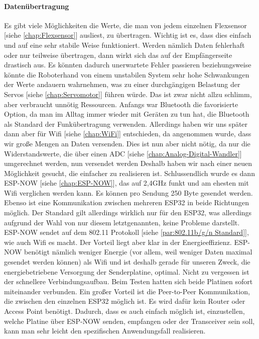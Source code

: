 \documentclass[titlepage,12pt,twoside]{article}
\begin{document}
\paragraph{Datenübertragung}
\label{par:Datenübertragung}
\hfill \break
\hfill \break
Es gibt viele Möglichkeiten die Werte, die man von jedem einzelnen Flexsensor [siehe \textcolor{blue}{\autoref{chap:Flexsensor}}] ausliest, zu übertragen. Wichtig ist es, dass 
dies einfach und auf eine sehr stabile Weise funktioniert. Werden nämlich Daten fehlerhaft oder nur teilweise übertragen, dann 
wirkt sich das auf der Empfängerseite drastisch aus. Es könnten dadurch unerwartete Fehler passieren beziehungsweise könnte die 
Roboterhand von einem unstabilen System sehr hohe Schwankungen der Werte andauern wahrnehmen, was zu einer durchgängigen 
Belastung der Servos [siehe \textcolor{blue}{\autoref{chap:Servomotor}}] führen würde. Das ist zwar nicht allzu schlimm, aber verbraucht unnötig Ressourcen. Anfangs war Bluetooth 
die favorisierte Option, da man im Alltag immer wieder mit Geräten zu tun hat, die Bluetooth als Standard der Funkübertragung 
verwenden. Allerdings haben wir uns später dann aber für Wifi [siehe \textcolor{blue}{\autoref{chap:WiFi}}] entschieden, da angenommen wurde, dass wir große Mengen an Daten 
versenden. Dies ist nun aber nicht nötig, da nur die Widerstandswerte, die über einen ADC [siehe \textcolor{blue}{\autoref{chap:Analog-Digital-Wandler}}] umgerechnet werden, nun versendet 
werden Deshalb haben wir nach einer neuen Möglichkeit gesucht, die einfacher zu realisieren ist. Schlussendlich wurde es dann 
ESP-NOW [siehe \textcolor{blue}{\autoref{chap:ESP-NOW}}], das auf 2,4GHz funkt und am ehesten mit Wifi verglichen werden kann. Es können pro Sendung 250 Byte gesendet werden. 
Ebenso ist eine Kommunikation zwischen mehreren ESP32 in beide Richtungen möglich. Der Standard gilt allerdings wirklich nur 
für den ESP32, was allerdings aufgrund der Wahl von nur diesem letztgenannten, keine Probleme darstellt. ESP-NOW sendet auf dem 
802.11 Protokoll [siehe \textcolor{blue}{\autoref{par:802.11b/g/n Standard}}], wie auch Wifi es macht. Der Vorteil liegt aber klar in der Energieeffizienz. ESP-NOW benötigt nämlich weniger 
Energie (vor allem, weil weniger Daten maximal gesendet werden können) als Wifi und ist deshalb gerade für unseren Zweck, die 
energiebetriebene Versorgung der Senderplatine, optimal. Nicht zu vergessen ist der schnellere Verbindungsaufbau. Beim Testen 
hatten sich beide Platinen sofort miteinander verbunden. Ein großer Vorteil ist die Peer-to-Peer Kommunikation, die zwischen 
den einzelnen ESP32 möglich ist. Es wird dafür kein Router oder Access Point benötigt. Dadurch, dass es auch einfach möglich 
ist, einzustellen, welche Platine über ESP-NOW senden, empfangen oder der Transceiver sein soll, kann man sehr leicht den 
spezifischen Anwendungsfall realisieren. \\
\\
\end{document}
